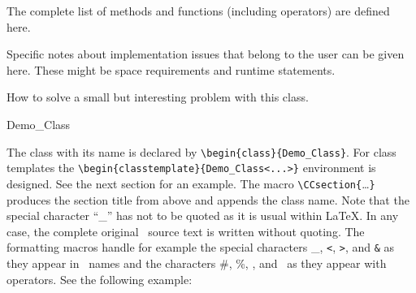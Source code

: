 \documentclass[12pt]{article}
\begin{document}
\operations The complete list of methods and functions (including
operators) are defined here.

\implementation Specific notes about implementation issues that belong
to the user can be given here. These might be space requirements and
runtime statements.

\example How to solve a small but interesting problem with this class.


\begin{class}{Demo_Class}

The class with its name is declared by 
\verb"\b"\verb"egin{class}{Demo_Class}". 
For class templates the \verb"\b"\verb"egin{classtemplate}{Demo_Class<...>}"
environment is  designed. See the next section for an example.
The macro \verb"\"\verb"CCsection{"\ldots\verb"}" produces the section
title from above and appends the class name. Note that the special
character ``\_'' has not to be quoted as it is usual within \LaTeX.
In any case, the complete original \CC\ source text is written
without quoting. The formatting macros handle for example the special
characters \_, {\tt <}, {\tt >}, and {\tt \&} as they appear in \CC\
names and the characters \#, \%, \CChat, and \CCtilde\ as they appear
with operators. See the following example: 
\CCstyle{
    #define %

This example is created using the {\verb+\CC+}{\tt style} macro
that formats its single parameter in this style.

To achieve this behavior with \TeX\, the \verb"\catcode" values of
some characters has to be changed. So within the \CC\ code 
things like comments with ``\%'' sign will not work. Several macros read a
second parameter with a \TeX\ comment to the declaration. The catcodes
are restored just before this second parameter. A sad sideeffect is
that these changed catcodes will not apply if these macros are invoked
within other macros. In that case, the argument text was just once
parsed from \TeX\ and the catcodes are all fixed before the catcode
changing macro expands.

\definition 

The class \classname\ does nothing. The formatted name of the class
can be accessed using the macro \verb"\"\verb"classname". The unformatted
name as it was originally written can be accessed using the
\verb"\"\verb"pureclassname" macro.

}
\end{class}
\end{document}

